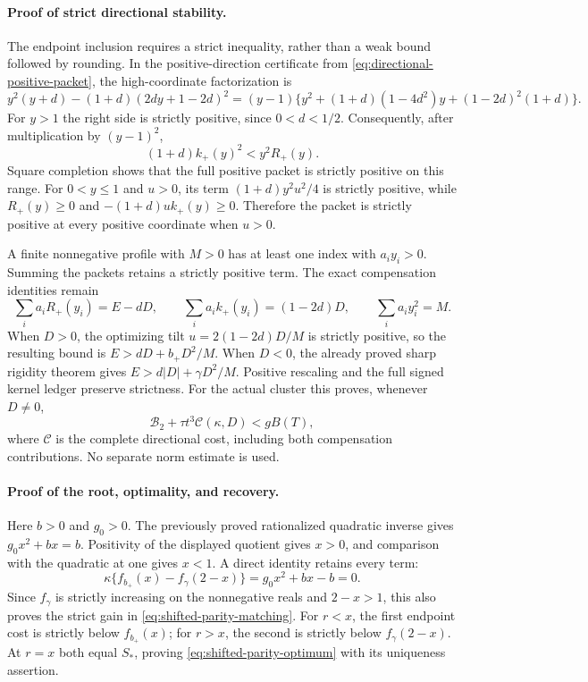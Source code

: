 \paragraph{Proof of strict directional stability.}
The endpoint inclusion requires a strict inequality, rather than a weak
bound followed by rounding.  In the positive-direction certificate from
\eqref{eq:directional-positive-packet}, the high-coordinate factorization is
\[
 y^2(y+d)-(1+d)(2dy+1-2d)^2
 =(y-1)\{y^2+(1+d)(1-4d^2)y+(1-2d)^2(1+d)\}.
\]
For \(y>1\) the right side is strictly positive, since \(0<d<1/2\).
Consequently, after multiplication by \((y-1)^2\),
\[
 (1+d)k_+(y)^2<y^2R_+(y).
\]
Square completion shows that the full positive packet is strictly positive
on this range.  For \(0<y\le1\) and \(u>0\), its term
\((1+d)y^2u^2/4\) is strictly positive, while
\(R_+(y)\ge0\) and \(- (1+d)u k_+(y)\ge0\).
Therefore the packet is strictly positive at every positive coordinate
when \(u>0\).

A finite nonnegative profile with \(M>0\) has at least one index with
\(a_i y_i>0\).  Summing the packets retains a strictly positive term.
The exact compensation identities remain
\[
 \sum_i a_iR_+(y_i)=E-dD,\qquad
 \sum_i a_i k_+(y_i)=(1-2d)D,\qquad
 \sum_i a_i y_i^2=M.
\]
When \(D>0\), the optimizing tilt \(u=2(1-2d)D/M\) is strictly positive,
so the resulting bound is \(E>dD+b_+D^2/M\).  When \(D<0\), the already
proved sharp rigidity theorem gives \(E>d|D|+\gamma D^2/M\).
Positive rescaling and the full signed kernel ledger preserve strictness.
For the actual cluster this proves, whenever \(D\ne0\),
\begin{equation}
 \mathcal B_2+\tau t^3\mathcal C(\kappa,D)<gB(T),
 \label{eq:shifted-parity-strict-consumer}
\end{equation}
where \(\mathcal C\) is the complete directional cost, including both
compensation contributions.  No separate norm estimate is used.

\paragraph{Proof of the root, optimality, and recovery.}
Here \(b>0\) and \(g_0>0\).  The previously proved rationalized quadratic
inverse gives \(g_0x^2+bx=b\).  Positivity of the displayed quotient gives
\(x>0\), and comparison with the quadratic at one gives \(x<1\).
A direct identity retains every term:
\[
 \kappa\{f_{b_+}(x)-f_\gamma(2-x)\}
 =g_0x^2+bx-b=0.
\]
Since \(f_\gamma\) is strictly increasing on the nonnegative reals and
\(2-x>1\), this also proves the strict gain in
\eqref{eq:shifted-parity-matching}.  For \(r<x\), the first endpoint cost
is strictly below \(f_{b_+}(x)\); for \(r>x\), the second is strictly below
\(f_\gamma(2-x)\).  At \(r=x\) both equal \(S_*\), proving
\eqref{eq:shifted-parity-optimum} with its uniqueness assertion.

